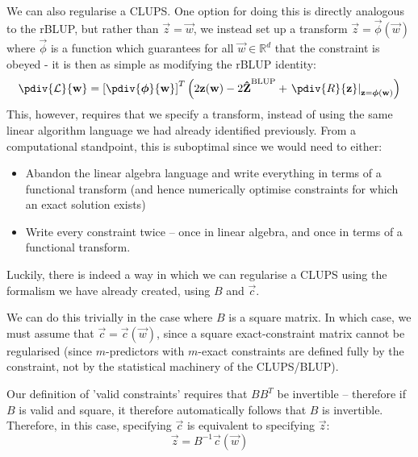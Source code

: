 \documentclass[]{article}
\begin{document}
			We can also regularise a CLUPS. One option for doing this is directly analogous to the rBLUP, but rather than $\vec{z} = \vec{w}$, we instead set up a transform $\vec{z} = \vec{\phi}(\vec{w})$ where $\vec{\phi}$ is a function which guarantees for all $\vec{w} \in \mathbb{R}^d$ that the constraint is obeyed - it is then as simple as modifying the rBLUP identity:
			\begin{equation}
				\pdiv{\mathcal{L}}{\vec{w}} = \left[ \pdiv{\vec{\phi}}{\vec{w}} \right]^T \left( 2\vec{z}(\vec{w}) - 2\vec{\hat{Z}}^\text{BLUP}+ \left.\pdiv{R}{\vec{z}}\right|_{\vec{z} = \vec{\phi}(\vec{w})}\right)
			\end{equation}
			This, however, requires that we specify a transform, instead of using the same linear algorithm language we had already identified previously. From a computational standpoint, this is suboptimal since we would need to either:
			\begin{itemize}
				\item Abandon the linear algebra language and write everything in terms of a functional transform (and hence numerically optimise constraints for which an exact solution exists)
				\item Write every constraint twice -- once in linear algebra, and once in terms of a functional transform.
			\end{itemize}
			Luckily, there is indeed a way in which we can regularise a CLUPS using the formalism we have already created, using $B$ and $\vec{c}$. 

			We can do this trivially in the case where $B$ is a square matrix. In which case, we must assume that $\vec{c} = \vec{c}(\vec{w})$, since a square exact-constraint matrix cannot be regularised (since $m$-predictors with $m$-exact constraints are defined fully by the constraint, not by the statistical machinery of the CLUPS/BLUP).

			
			
			Our definition of 'valid constraints' requires that $BB^T$ be invertible -- therefore if $B$ is valid and square, it therefore automatically follows that $B$ is invertible. Therefore, in this case, specifying $\vec{c}$ is equivalent to specifying $\vec{z}$:
			\begin{equation}
				\vec{z} = B^{-1} \vec{c}(\vec{w})
			\end{equation}
\end{document}
